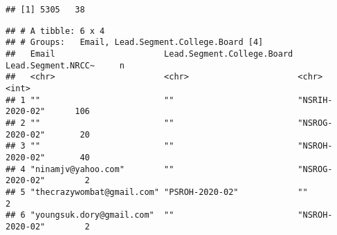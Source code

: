 \documentclass[
]{article}
\newenvironment{Shaded}{\begin{snugshade}}{\end{snugshade}}
\newcommand{\DataTypeTok}[1]{\textcolor[rgb]{0.13,0.29,0.53}{#1}}
\newcommand{\DecValTok}[1]{\textcolor[rgb]{0.00,0.00,0.81}{#1}}
\newcommand{\KeywordTok}[1]{\textcolor[rgb]{0.13,0.29,0.53}{\textbf{#1}}}
\newcommand{\NormalTok}[1]{#1}
\newcommand{\OperatorTok}[1]{\textcolor[rgb]{0.81,0.36,0.00}{\textbf{#1}}}
\newcommand{\StringTok}[1]{\textcolor[rgb]{0.31,0.60,0.02}{#1}}
\begin{document}
\begin{verbatim}
## [1] 5305   38
\end{verbatim}

\begin{Shaded}
\end{Shaded}

\begin{verbatim}
## # A tibble: 6 x 4
## # Groups:   Email, Lead.Segment.College.Board [4]
##   Email                      Lead.Segment.College.Board Lead.Segment.NRCC~     n
##   <chr>                      <chr>                      <chr>              <int>
## 1 ""                         ""                         "NSRIH-2020-02"      106
## 2 ""                         ""                         "NSROG-2020-02"       20
## 3 ""                         ""                         "NSROH-2020-02"       40
## 4 "ninamjv@yahoo.com"        ""                         "NSROG-2020-02"        2
## 5 "thecrazywombat@gmail.com" "PSROH-2020-02"            ""                     2
## 6 "youngsuk.dory@gmail.com"  ""                         "NSROH-2020-02"        2
\end{verbatim}

\begin{Shaded}
\end{Shaded}
\end{document}
